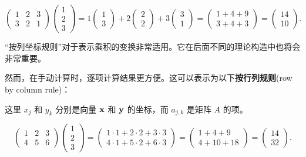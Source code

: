 \begin{example*}
$$
\begin{pmatrix} 1 & 2 & 3 \\ 3 & 2 & 1 \end{pmatrix} \begin{pmatrix} 1 \\ 2 \\ 3 \end{pmatrix} = 1 \begin{pmatrix} 1 \\ 3 \end{pmatrix} + 2 \begin{pmatrix} 2 \\ 2 \end{pmatrix} + 3 \begin{pmatrix} 3 \\ 1 \end{pmatrix} = \begin{pmatrix} 1+4+9 \\ 3+4+3 \end{pmatrix} = \begin{pmatrix} 14 \\ 10 \end{pmatrix}.
$$
\end{example*}

“按列坐标规则”对于表示乘积的变换非常适用。它在后面不同的理论构造中也将会非常重要。

然而，在手动计算时，逐项计算结果更方便。这可以表示为以下\textbf{按行列规则}(row by column rule)：



这里 $x_j$ 和 $y_k$ 分别是向量 $\mathbf{x}$ 和 $\mathbf{y}$ 的坐标，而 $a_{j,k}$ 是矩阵 $A$ 的项。

\begin{example*}
$$
\begin{pmatrix} 1 & 2 & 3 \\ 4 & 5 & 6 \end{pmatrix} \begin{pmatrix} 1 \\ 2 \\ 3 \end{pmatrix} = \begin{pmatrix} 1 \cdot 1 + 2 \cdot 2 + 3 \cdot 3 \\ 4 \cdot 1 + 5 \cdot 2 + 6 \cdot 3 \end{pmatrix} = \begin{pmatrix} 1+4+9 \\ 4+10+18 \end{pmatrix} = \begin{pmatrix} 14 \\ 32 \end{pmatrix}.
$$
\end{example*}


